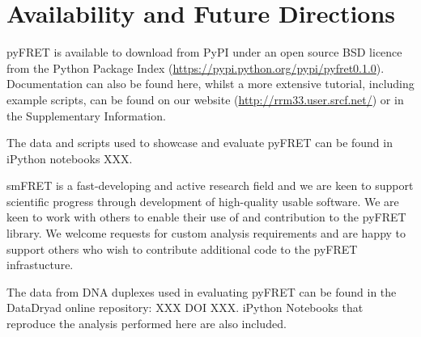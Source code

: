 \section{Availability and Future Directions}
pyFRET is available to download from PyPI under an open source BSD licence from the Python Package Index (\url{https://pypi.python.org/pypi/pyfret0.1.0}). Documentation can also be found here, whilst a more extensive tutorial, including example scripts, can be found on our website (\url{http://rrm33.user.srcf.net/}) or in the Supplementary Information.

The data and scripts used to showcase and evaluate pyFRET can be found in iPython notebooks XXX.

smFRET is a fast-developing and active research field and we are keen to support scientific progress through development of high-quality usable software. We are keen to work with others to enable their use of and contribution to the pyFRET library. We welcome requests for custom analysis requirements and are happy to support others who wish to contribute additional code to the pyFRET infrastucture. 

The data from DNA duplexes used in evaluating pyFRET can be found in the DataDryad online repository: XXX DOI XXX. iPython Notebooks that reproduce the analysis performed here are also included.









